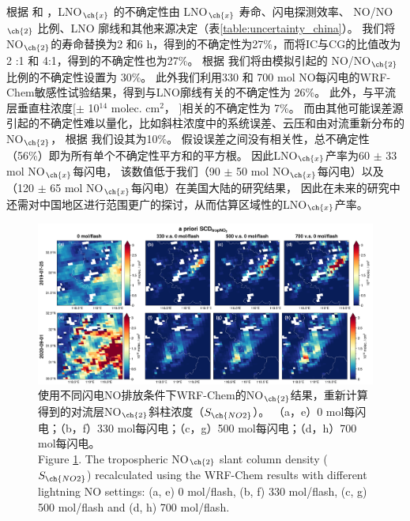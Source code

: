 根据 \citet{Allen.2019} 和 \citet{Zhang.2020b}，LNO$_{\ch{x}}$ 的不确定性由 LNO$_{\ch{x}}$ 寿命、闪电探测效率、
NO/NO$_{\ch{2}}$ 比例、LNO 廓线和其他来源决定（表\ref{table:uncertainty_china}）。
我们将NO$_{\ch{2}}$的寿命替换为2 和6 h，得到的不确定性为27\%，而将IC与CG的比值改为2 :1 和 4:1，得到的不确定性也为27\%。
根据 \citet{Allen.2019} 我们将由模拟引起的 NO/NO$_{\ch{2}}$ 比例的不确定性设置为 30\%。
此外我们利用330 和 700 mol NO每闪电的WRF-Chem敏感性试验结果，得到与LNO廓线有关的不确定性为 26\%。
此外，与平流层垂直柱浓度[$\pm$ 10$^{14}$ molec. cm$^2$， \citet{VanGeffen.2022}]相关的不确定性为 7\%。
而由其他可能误差源引起的不确定性难以量化，比如斜柱浓度中的系统误差、云压和由对流重新分布的 NO$_{\ch{2}}$，
根据 \citet{Allen.2021a}我们设其为10\%。
假设误差之间没有相关性，总不确定性（56\%）即为所有单个不确定性平方和的平方根。
因此LNO$_{\ch{x}}$产率为60 $\pm$ 33 mol NO$_{\ch{x}}$每闪电，
该数值低于我们（90 $\pm$ 50 mol NO$_{\ch{x}}$每闪电）以及\citet{Allen.2021a}（120 $\pm$ 65 mol NO$_{\ch{x}}$每闪电）在美国大陆的研究结果，
因此在未来的研究中还需对中国地区进行范围更广的探讨，从而估算区域性的LNO$_{\ch{x}}$产率。


\begin{landscape}
\vspace*{\fill}
\begin{figure}[H]
    \centering
    \includegraphics[width=0.9\columnwidth]{./figures/s5p_apriori_scd.png}
    \caption{使用不同闪电NO排放条件下WRF-Chem的NO$_{\ch{2}}$结果，重新计算得到的对流层NO$_{\ch{2}}$斜柱浓度（$S_{\ch{NO2}}$）。
    （a，e）0 mol每闪电；（b，f）330 mol每闪电；（c，g）500 mol每闪电；（d，h）700 mol每闪电。\\
    Figure \ref{fig:s5p_apriori_scd}. The tropospheric NO$_{\ch{2}}$ slant column density ($S_{\ch{NO2}}$) recalculated using the WRF-Chem results with different lightning NO settings: (a, e) 0 mol/flash, (b, f) 330 mol/flash, (c, g) 500 mol/flash and (d, h) 700 mol/flash.
    }
    \label{fig:s5p_apriori_scd}
\end{figure}
\vspace*{\fill}
\end{landscape}

